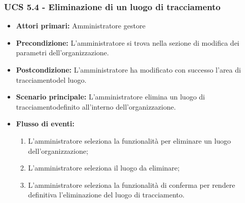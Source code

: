 \subsubsection{UCS 5.4 - Eliminazione di un luogo di tracciamento}%
\begin{itemize}
    \item \textbf{Attori primari:} Amministratore gestore
    \item \textbf{Precondizione:} L'amministratore si trova nella sezione di modifica dei parametri dell'organizzazione.
    \item \textbf{Postcondizione:} L'amministratore ha modificato con successo l'area di tracciamentodel luogo.
    \item \textbf{Scenario principale:} L'amministratore elimina un luogo di tracciamentodefinito all'interno dell'organizzazione.
    \item \textbf{Flusso di eventi:}
    \begin{enumerate}%
        \item L'amministratore seleziona la funzionalità per eliminare un luogo dell'organizzazione;
        \item L'amministratore seleziona il luogo da eliminare;
        \item L'amministratore seleziona la funzionalità di conferma per rendere definitiva l'eliminazione del luogo di tracciamento.
    \end{enumerate}
\end{itemize}

